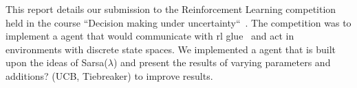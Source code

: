 This report details our submission to the Reinforcement Learning competition held in the course ``Decision making under uncertainty``~\cite{decmaking}. The competition was to implement a agent that would communicate with rl glue~\cite{rl-glue} and act in environments with discrete state spaces.
We implemented a agent that is built upon the ideas of Sarsa($\lambda$) and present the results of varying parameters and additions? (UCB, Tiebreaker) to improve results.